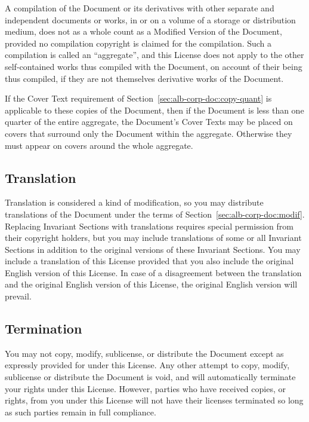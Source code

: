 \documentclass[11pt,a4paper,oneside]{article}
\begin{document}
\begin{albTitlePage}
A compilation of the Document or its derivatives with other separate and
independent documents or works, in or on a volume of a storage or
distribution medium, does not as a whole count as a Modified Version of
the Document, provided no compilation copyright is claimed for the
compilation.  Such a compilation is called an ``aggregate'', and this
License does not apply to the other self-contained works thus compiled
with the Document, on account of their being thus compiled, if they are
not themselves derivative works of the Document.

If the Cover Text requirement of
Section~\ref{sec:alb-corp-doc:copy-quant} is applicable to these copies
of the Document, then if the Document is less than one quarter of the
entire aggregate, the Document's Cover Texts may be placed on covers
that surround only the Document within the aggregate.  Otherwise they
must appear on covers around the whole aggregate.


\subsection{Translation}
\label{sec:alb-corp-doc:transl}

Translation is considered a kind of modification, so you may distribute
translations of the Document under the terms of
Section~\ref{sec:alb-corp-doc:modif}.  Replacing Invariant Sections with
translations requires special permission from their copyright holders,
but you may include translations of some or all Invariant Sections in
addition to the original versions of these Invariant Sections.  You may
include a translation of this License provided that you also include the
original English version of this License.  In case of a disagreement
between the translation and the original English version of this
License, the original English version will prevail.


\subsection{Termination}
\label{sec:alb-corp-doc:term}

You may not copy, modify, sublicense, or distribute the Document except
as expressly provided for under this License.  Any other attempt to
copy, modify, sublicense or distribute the Document is void, and will
automatically terminate your rights under this License.  However,
parties who have received copies, or rights, from you under this License
will not have their licenses terminated so long as such parties remain
in full compliance.



\end{albTitlePage}
\end{document}

